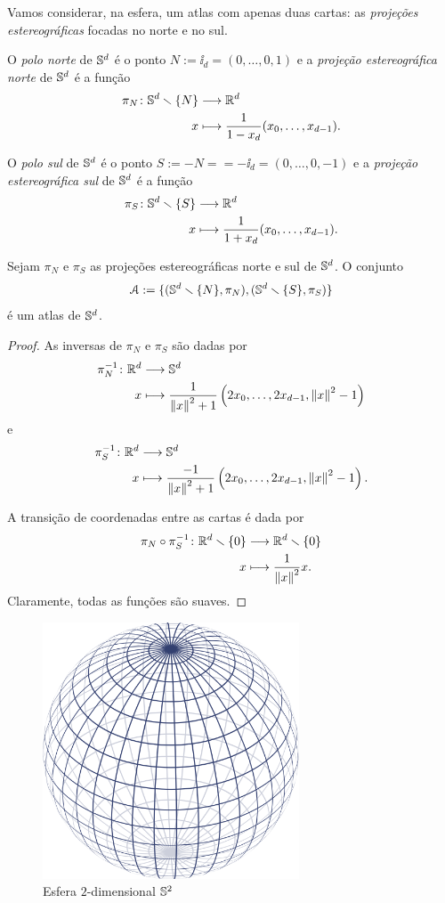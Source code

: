 Vamos considerar, na esfera, um atlas com apenas duas cartas: as \emph{projeções estereográficas} focadas no norte e no sul.

\begin{definition}
O \emph{polo norte} de $\S^d$ é o ponto $N := \ii_d = (0,\ldots,0,1)$ e a \emph{projeção estereográfica norte} de $\S^d$ é a função
	\begin{align*}
	\func{\pi_N}{\S^d \setminus\{N\}}{\R^d}{x}{\frac{1}{1-x_d}(x_0,\ldots,x_{d-1})}.
	\end{align*}

O \emph{polo sul} de $\S^d$ é o ponto $S := -N = = -\ii_d = (0,\ldots,0,-1)$ e a \emph{projeção estereográfica sul} de $\S^d$ é a função
	\begin{align*}
	\func{\pi_S}{\S^d \setminus\{S\}}{\R^d}{x}{\frac{1}{1+x_d}(x_0,\ldots,x_{d-1})}.
	\end{align*}
\end{definition}

\begin{proposition}
Sejam $\pi_N$ e $\pi_S$ as projeções estereográficas norte e sul de $\S^d$. O conjunto
	\begin{equation*}
	\atlas := \{(\S^d \setminus\{N\},\pi_N),(\S^d \setminus\{S\},\pi_S)\}
	\end{equation*}
é um atlas de $\S^d$.
\end{proposition}
\begin{proof}
As inversas de $\pi_N$ e $\pi_S$ são dadas por
	\begin{align*}
	\func{\pi_N\inv}{\R^d}{\S^d}{x}{\frac{1}{\nor{x}^2 + 1}\left(2x_0,\ldots,2x_{d-1},\nor{x}^2 - 1\right)}
	\end{align*}
e
	\begin{align*}
	\func{\pi_S\inv}{\R^d}{\S^d}{x}{\frac{-1}{\nor{x}^2+1}\left(2x_0,\ldots,2x_{d-1},\nor{x}^2-1\right)}.
	\end{align*}

A transição de coordenadas entre as cartas é dada por
	\begin{align*}
	\func{\pi_N \circ \pi_S\inv}{\R^d \setminus\{0\}}{\R^d \setminus\{0\}}{x}{\frac{1}{\nor{x}^2}x}.
	\end{align*}
Claramente, todas as funções são suaves.
\end{proof}

\begin{figure}
\centering
\includegraphics[width=3in]{./imagens/esfera}
\caption{Esfera $2$-dimensional \ensuremath{\S^2}}
\end{figure}

